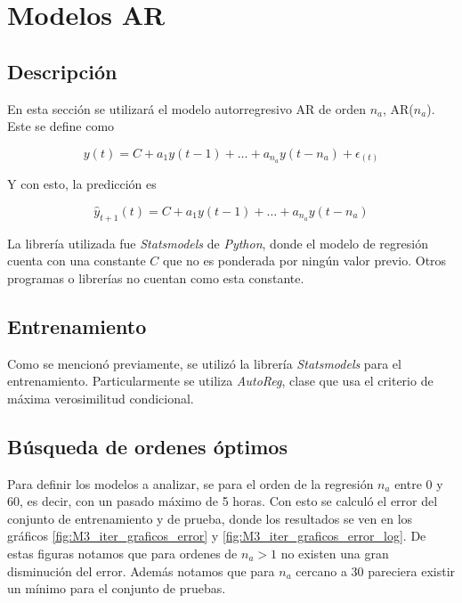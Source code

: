 
\section{Modelos AR}

\subsection{Descripción}

En esta sección se utilizará el modelo autorregresivo AR de orden $n_a$, AR($n_a$). Este se define como

\begin{equation}
	y(t) = C + a_1 y(t-1) + \dots + a_{n_a} y(t-n_a) + \epsilon_(t)
\end{equation}

Y con esto, la predicción es

\begin{equation}
	\hat{y}_{t+1}(t) = C + a_1 y(t-1) + \dots + a_{n_a} y(t - n_a)
\end{equation}

La librería utilizada fue \emph{Statsmodels} de \emph{Python}, donde el modelo de regresión cuenta con una constante $C$ que no es ponderada por ningún valor previo. Otros programas o librerías no cuentan como esta constante.


\subsection{Entrenamiento}

Como se mencionó previamente, se utilizó la librería \emph{Statsmodels} para el entrenamiento. Particularmente se utiliza \emph{AutoReg}, clase que usa el criterio de máxima verosimilitud condicional.

\subsection{Búsqueda de ordenes óptimos}

Para definir los modelos a analizar, se para el orden de la regresión $n_a$ entre 0 y 60, es decir, con un pasado máximo de 5 horas. Con esto se calculó el error del conjunto de entrenamiento y de prueba, donde los resultados se ven en los gráficos \ref{fig:M3_iter_graficos_error} y \ref{fig:M3_iter_graficos_error_log}. De estas figuras notamos que para ordenes de $n_a > 1$ no existen una gran disminución del error. Además notamos que para $n_a$ cercano a 30 pareciera existir un mínimo para el conjunto de pruebas.


